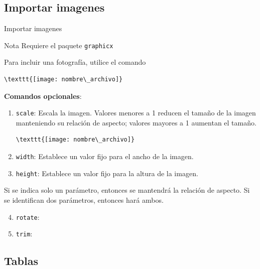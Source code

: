 \documentclass[../slides.tex]{subfiles}
\begin{document}
    
    \begin{frame}
        \tableofcontents[sections=\value{section}]
    \end{frame}

    \subsection{Importar imagenes}
    \begin{frame}[fragile]{Importar imagenes}
        \begin{block}{Nota}
            Requiere el paquete \texttt{graphicx}
        \end{block}

        Para incluir una fotografía, utilice el comando 
        \begin{verbatim}
\texttt{[image: nombre\_archivo]}
        \end{verbatim}
        \textbf{Comandos opcionales}:
            \begin{enumerate}
                \item \texttt{scale}: Escala la imagen. Valores menores a 1 reducen el tamaño de la imagen manteniendo su relación de aspecto; valores mayores a 1 aumentan el tamaño.
        \begin{verbatim}
\texttt{[image: nombre\_archivo]}
        \end{verbatim}
                \item \texttt{width}: Establece un valor fijo para el ancho de la imagen.
                \item \texttt{height}: Establece un valor fijo para la altura de la imagen.
            \end{enumerate}
        Si se indica solo un parámetro, entonces se mantendrá la relación de aspecto. Si se identifican dos parámetros, entonces hará ambos.
    \end{frame}
    
    \begin{frame}
            \begin{enumerate}
                \setcounter{enumi}{3}
                \item \texttt{rotate}:
                \item \texttt{trim}:
            \end{enumerate}
        
    \end{frame}

    \subsection{Tablas}
\end{document}
